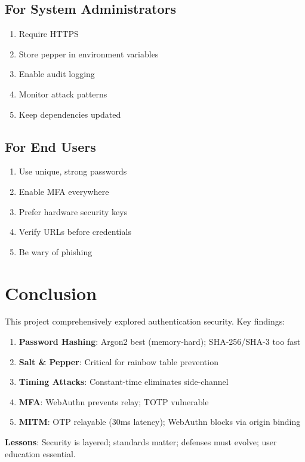 \documentclass[12pt,a4paper]{article}
\begin{document}
\subsection{For System Administrators}
\begin{enumerate}
\item Require HTTPS
\item Store pepper in environment variables
\item Enable audit logging
\item Monitor attack patterns
\item Keep dependencies updated
\end{enumerate}

\subsection{For End Users}
\begin{enumerate}
\item Use unique, strong passwords
\item Enable MFA everywhere
\item Prefer hardware security keys
\item Verify URLs before credentials
\item Be wary of phishing
\end{enumerate}

\section{Conclusion}

This project comprehensively explored authentication security. Key findings:

\begin{enumerate}
\item \textbf{Password Hashing}: Argon2 best (memory-hard); SHA-256/SHA-3 too fast
\item \textbf{Salt \& Pepper}: Critical for rainbow table prevention
\item \textbf{Timing Attacks}: Constant-time eliminates side-channel
\item \textbf{MFA}: WebAuthn prevents relay; TOTP vulnerable
\item \textbf{MITM}: OTP relayable (30ms latency); WebAuthn blocks via origin binding
\end{enumerate}

\textbf{Lessons}: Security is layered; standards matter; defenses must evolve; user education essential.
\end{document}
